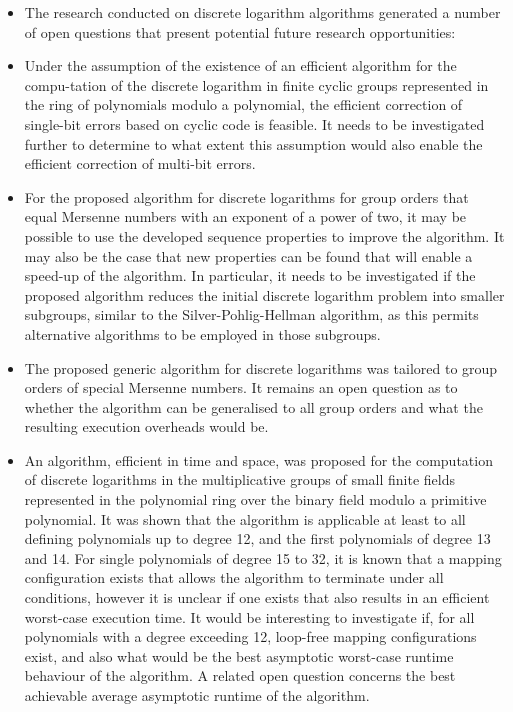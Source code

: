 \documentclass[a4paper, 11pt]{article}
\newcounter{subsubsubsection}[subsubsection]
\begin{document}
\begin{itemize}
\item The research conducted on discrete logarithm algorithms generated a number of open questions that present potential future research opportunities:

\item Under the assumption of the existence of an efficient algorithm for the compu-tation of the discrete logarithm in finite cyclic groups represented in the ring of polynomials modulo a polynomial, the efficient correction of single-bit errors based on cyclic code is feasible. It needs to be investigated further to determine to what extent this assumption would also enable the efficient correction of multi-bit errors.

\item For the proposed algorithm for discrete logarithms for group orders that equal Mersenne numbers with an exponent of a power of two, it may be possible to use the developed sequence properties to improve the algorithm. It may also be the case that new properties can be found that will enable a speed-up of the algorithm. In particular, it needs to be investigated if the proposed algorithm reduces the initial discrete logarithm problem into smaller subgroups, similar to the Silver-Pohlig-Hellman algorithm, as this permits alternative algorithms to be employed in those subgroups.

\item The proposed generic algorithm for discrete logarithms was tailored to group orders of special Mersenne numbers. It remains an open question as to whether the algorithm can be generalised to all group orders and what the resulting execution overheads would be.

\item An algorithm, efficient in time and space, was proposed for the computation of discrete logarithms in the multiplicative groups of small finite fields represented in the polynomial ring over the binary field modulo a primitive polynomial. It was shown that the algorithm is applicable at least to all defining polynomials up to degree 12, and the first polynomials of degree 13 and 14. For single polynomials of degree 15 to 32, it is known that a mapping configuration exists that allows the algorithm to terminate under all conditions, however it is unclear if one exists that also results in an efficient worst-case execution time. It would be interesting to investigate if, for all polynomials with a degree exceeding 12, loop-free mapping configurations exist, and also what would be the best asymptotic worst-case runtime behaviour of the algorithm. A related open question concerns the best achievable average asymptotic runtime of the algorithm.


\end{itemize}
\end{document}
